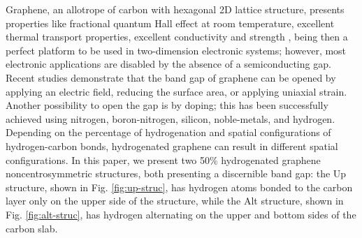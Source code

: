 \documentclass[floatfix,prb,aps,superscriptaddress,showpacs,11pt,preprint,letterpaper]{revtex4}
\begin{document}
Graphene, an allotrope of carbon with hexagonal 2D lattice structure, presents
properties like fractional quantum Hall effect at room temperature, excellent
thermal transport properties, excellent conductivity\cite{heerscheNat07} and
strength \cite{geimNM07, reinaNL08, novoselov2S07, balandinNL08}, being then a
perfect platform to be used in two-dimension electronic systems; however, most
electronic applications are disabled by the absence of a semiconducting gap.
Recent studies demonstrate that the band gap of graphene can be opened by
applying an electric field,\cite{zhangN09} reducing the surface
area,\cite{hanPRL07} or applying uniaxial strain.\cite{niACSN08} Another
possibility to open the gap is by doping; this has been successfully achieved
using nitrogen,\cite{weiNL2009} boron-nitrogen,\cite{guoIJ11}
silicon,\cite{colettiPRB10} noble-metals,\cite{varykhalovPRB10} and
hydrogen.\cite{eliasS09, guisingerNL09, samarakoonACSN10}
% 
Depending on the percentage of hydrogenation and spatial configurations of
hydrogen-carbon bonds, hydrogenated graphene can result in different spatial
configurations.
% 
In this paper, we present two 50\% hydrogenated graphene noncentrosymmetric
structures, both presenting a discernible band gap: the Up structure,
shown in Fig. \ref{fig:up-struc}, has hydrogen atoms bonded to the carbon layer
only on the upper side of the structure, while the Alt structure, shown
in Fig. \ref{fig:alt-struc}, has hydrogen alternating on the upper and bottom
sides of the carbon slab.\cite{zapataPSB2016}
\end{document}
